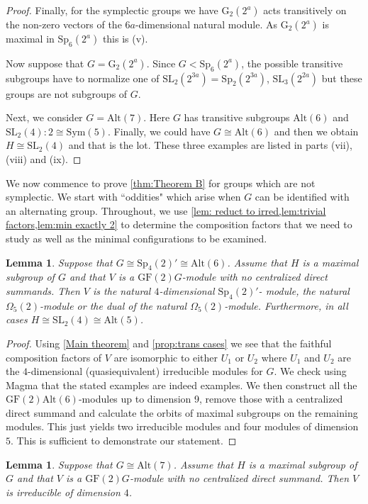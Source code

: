 \documentclass[12pt]{amsart}
\newtheorem{lemma}[theorem]{Lemma}
\theoremstyle{remark}
\theoremstyle{notation}
\theoremstyle{definition}
\newcommand{\G}{\mathrm{G}}
\newcommand{\GF}{\mathrm{GF}}
\newcommand{\Sp}{\mathrm{Sp}}
\newcommand{\SL}{\mathrm{SL}}
\newcommand{\0}{\emptyset}
\newcommand{\Sym}{\mathrm{Sym}}
\newcommand{\Alt}{\mathrm{Alt}}
\begin{document}
\begin{proof}
Finally, for the symplectic groups we have $\G_{2}(2^a)$ acts transitively on the non-zero vectors  of the $6a$-dimensional natural module.  As $\G_2(2^a)$ is maximal in $\Sp_{6}(2^a)$  this is (v).

Now suppose that $G=\G_{2}(2^a)$. Since $G< \Sp_{6}(2^a)$, the possible transitive subgroups have to normalize  one of $\SL_2(2^{3a})=\Sp_{2}(2^{3a})$, $\SL_3(2^{2a})$ but these groups are not subgroups of $G$.

Next, we consider $G=\Alt(7)$. Here $G$ has transitive subgroups $\Alt(6)$ and $\SL_2(4){:}2\cong \Sym(5)$. Finally, we could have $G \cong \Alt(6)$ and then we obtain $H\cong \SL_2(4)$ and that is the lot. These three examples are listed in parts (vii), (viii) and (ix).
 \end{proof}

We now commence to prove \cref{thm:Theorem B} for groups which are not symplectic.  We start with   ``oddities" which arise when $G$ can be identified with an alternating group. Throughout, we use \cref{lem: reduct to irred,lem:trivial factors,lem:min exactly 2} to determine the composition factors that we need to study as well as the minimal configurations to be examined.

\begin{lemma}\label{lem:alt(6) done} Suppose that $G \cong \Sp_4(2)'\cong \Alt(6)$. Assume that $H$ is a maximal subgroup of $G$ and that $V$ is a $\GF(2)G$-module with no centralized direct summands. Then $V$ is the natural $4$-dimensional $\Sp_4(2)'$- module, the natural $\Omega_5(2)$-module or the dual of the natural $\Omega_5(2)$-module. Furthermore, in all cases $H \cong \SL_2(4)\cong \Alt(5)$.
\end{lemma}

\begin{proof} Using \cref{Main theorem} and \cref{prop:trans cases} we see that the faithful composition factors of $V$ are isomorphic to either $U_1$ or $U_2$ where $U_1$ and $U_2$ are the $4$-dimensional (quasiequivalent) irreducible modules for $G$.
 We check using {\sc Magma} that the stated examples are indeed examples. We then construct all the $\GF(2)\Alt(6)$-modules up to dimension 9, remove those with a centralized direct summand and calculate the orbits of maximal subgroups on the remaining modules. This just yields two irreducible modules and four modules of dimension $5$. This is sufficient to  demonstrate our statement.
\end{proof}

\begin{lemma}\label{Alt(7) gone}
Suppose that $G \cong \Alt(7)$. Assume that $H$ is a maximal subgroup of $G$ and that $V$ is a $\GF(2)G$-module with no centralized direct summand. Then $V$  is irreducible of dimension $4$.
\end{lemma}
\end{document}
